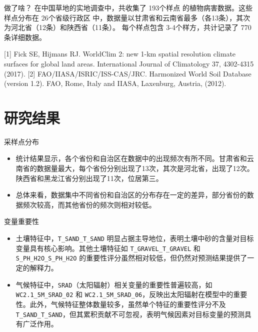 \documentclass{ldr-simple-gray}
\begin{document}
\begin{frame}{做了啥？}
    在中国草地的实地调查中，共收集了 193个样点 的植物病害数据。这些样点分布在 26个省级行政区 中，数据量以甘肃省和云南省最多（各13条），其次为河北省（12条）和陕西省（11条）。
    每个样点包含 3-4个样方，共计记录了 770条详细数据。
   
    [1] Fick SE, Hijmans RJ. WorldClim 2: new 1-km spatial resolution climate surfaces for global land areas. International Journal of Climatology 37, 4302-4315 (2017).
    [2] FAO/IIASA/ISRIC/ISS-CAS/JRC. Harmonized World Soil Database (version 1.2). FAO, Rome, Italy and IIASA, Laxenburg, Austria, (2012).
    


\end{frame}
\section{研究结果}
\begin{frame}{采样点分布}
    
    \begin{itemize}
        \item 统计结果显示，各个省份和自治区在数据中的出现频次有所不同。甘肃省和云南省的数据量最大，每个省份分别出现了13次，其次是河北省，出现了12次。陕西省和黑龙江省分别出现了11次，位居第三。
        
        \item 总体来看，数据集中不同省份和自治区的分布存在一定的差异，部分省份的数据频次较高，而其他省份的频次则相对较低。
        
    \end{itemize}
    
\end{frame}


\begin{frame}{变量重要性}
    
    \begin{itemize}
        \item 土壤特征中，\texttt{T\_SAND\_T\_SAND} 明显占据主导地位，表明土壤中砂的含量对目标变量具有核心影响。其他土壤特征如 \texttt{T\_GRAVEL\_T\_GRAVEL} 和 \texttt{S\_PH\_H2O\_S\_PH\_H2O} 的重要性评分虽然相对较低，但仍然对预测结果提供了一定的解释力。
        
        
        \item 气候特征中，\texttt{SRAD}（太阳辐射）相关变量的重要性普遍较高，如 \texttt{WC2.1\_5M\_SRAD\_02} 和 \texttt{WC2.1\_5M\_SRAD\_06}，反映出太阳辐射在模型中的重要性。此外，气候特征整体数量较多，虽然单个特征的重要性评分不及 \texttt{T\_SAND\_T\_SAND}，但其累积贡献不可忽视，表明气候因素对目标变量的预测具有广泛作用。
        
    \end{itemize}
    
\end{frame}
\end{document}
